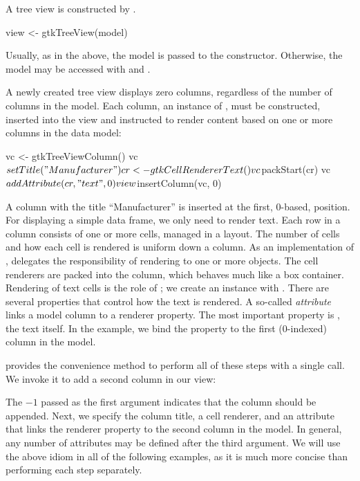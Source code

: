 A tree view is constructed by . 
\begin{Schunk}
\begin{Sinput}
 view <- gtkTreeView(model)
\end{Sinput}
\end{Schunk}
Usually, as in the above, the model is passed to the
constructor. Otherwise, the model may be accessed with
 and .

A newly created tree view displays zero columns, regardless of the
number of columns in the model. Each column, an instance of
, must be constructed, inserted into the view and
instructed to render content based on one or more columns in the data
model:
\begin{Schunk}
\begin{Sinput}
 vc <- gtkTreeViewColumn()
 vc$setTitle("Manufacturer")
 cr <- gtkCellRendererText()
 vc$packStart(cr)
 vc$addAttribute(cr, "text", 0)
 view$insertColumn(vc, 0)
\end{Sinput}
\end{Schunk}
%
A column with the title ``Manufacturer'' is inserted at the first,
$0$-based, position. For displaying a simple data frame, we only need
to render text. Each row in a column consists of one or more cells,
managed in a layout. The number of cells and how each cell is rendered
is uniform down a column. As an implementation of
,  delegates the
responsibility of rendering to one or more 
objects. The cell renderers are packed into the column, which behaves
much like a box container. Rendering of text cells is the role of
; we create an instance with
. There are several properties that
control how the text is rendered. A so-called \textit{attribute} links
a model column to a renderer property. The most important property is
, the text itself. In the example, we bind the 
property to the first ($0$-indexed) column in the model.

 provides the
 convenience method to
perform all of these steps with a single call. We invoke it to add a
second column in our view:
\begin{Schunk}
\end{Schunk}
% 
The $-1$ passed as the first argument indicates that the column should
be appended. Next, we specify the column title, a cell renderer, and
an attribute that links the  renderer property to the
second column in the model. In general, any number of attributes may
be defined after the third argument.  We will use the above idiom in
all of the following examples, as it is much more concise than
performing each step separately.

